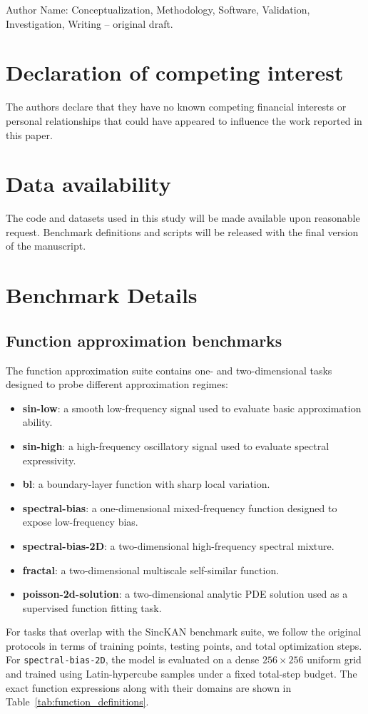 \documentclass[preprint,12pt]{elsarticle}
\begin{document}
Author Name: Conceptualization, Methodology, Software, Validation, Investigation, Writing -- original draft.

\section*{Declaration of competing interest}

The authors declare that they have no known competing financial interests or personal relationships that could have appeared to influence the work reported in this paper.

\section*{Data availability}

The code and datasets used in this study will be made available upon reasonable request. Benchmark definitions and scripts will be released with the final version of the manuscript.

\appendix

\section{Benchmark Details}
\label{app:benchmarks}

\subsection{Function approximation benchmarks}

The function approximation suite contains one- and two-dimensional tasks designed to probe different approximation regimes:
\begin{itemize}
  \item \textbf{sin-low}: a smooth low-frequency signal used to evaluate basic approximation ability.
  \item \textbf{sin-high}: a high-frequency oscillatory signal used to evaluate spectral expressivity.
  \item \textbf{bl}: a boundary-layer function with sharp local variation.
  \item \textbf{spectral-bias}: a one-dimensional mixed-frequency function designed to expose low-frequency bias.
  \item \textbf{spectral-bias-2D}: a two-dimensional high-frequency spectral mixture.
  \item \textbf{fractal}: a two-dimensional multiscale self-similar function.
  \item \textbf{poisson-2d-solution}: a two-dimensional analytic PDE solution used as a supervised function fitting task.
\end{itemize}
For tasks that overlap with the SincKAN benchmark suite, we follow the original protocols in terms of training points, testing points, and total optimization steps. For \texttt{spectral-bias-2D}, the model is evaluated on a dense \(256\times256\) uniform grid and trained using Latin-hypercube samples under a fixed total-step budget. The exact function expressions along with their domains are shown in Table~\ref{tab:function_definitions}.
\end{document}
